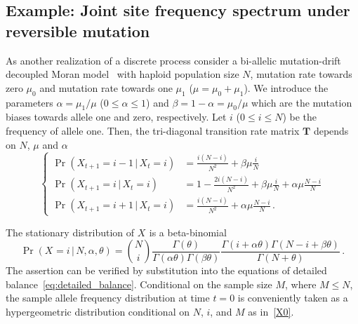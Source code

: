 \documentclass[preprint]{elsarticle}
\newcommand\given{{\,|\,}}
\newcommand\x[1]{\ensuremath{X_{#1}}}
\begin{document}
\subsection{Example: Joint site frequency spectrum under reversible mutation}\label{section:discr_rev_general}
As another realization of a discrete process consider a bi-allelic mutation-drift decoupled Moran model~\citep{Baak08,Ethe09} with haploid population size $N$, mutation rate towards zero $\mu_0$ and mutation rate towards one $\mu_1$ ($\mu=\mu_0+\mu_1$).  We introduce the parameters $\alpha=\mu_1/\mu$ ($0 \leq \alpha \leq 1$) and $\beta=1-\alpha=\mu_0/\mu$ which are the mutation biases towards allele one and zero, respectively.  Let $i$ ($0\leq i\leq N$) be the frequency of allele one. Then, the tri-diagonal transition rate matrix $\mathbf{T}$ depends on $N$, $\mu$ and $\alpha$
\begin{equation}\label{eq:transition_decoupled_Moran}
\begin{cases}
\Pr(\x{t+1}=i-1\given \x{t}=i)&=\frac{i(N-i)}{N^2}+\beta\mu \frac{i}{N}\\
    \Pr(\x{t+1}=i\given \x{t}=i)&=1-\frac{2i(N-i)}{N^2}+\beta\mu \frac{i}{N} + \alpha\mu \frac{N-i}N\\
\Pr(\x{t+1}=i+1\given \x{t}=i)&=\frac{i(N-i)}{N^2}+\alpha\mu \frac{N-i}N\,.
\end{cases}
\end{equation}

The stationary distribution of $\x{}$ is a beta-binomial
\begin{equation}\label{beta_bin}
\Pr(\x{}=i\given N,\alpha,\theta)=\binom{N}{i}
\frac{\Gamma(\theta)}{\Gamma(\alpha\theta)\Gamma(\beta\theta)}
\frac{\Gamma(i+\alpha\theta)\Gamma(N-i+\beta\theta)}{\Gamma(N+\theta)}\,.
\end{equation}
The assertion can be verified by substitution into the equations of detailed balance~\eqref{eq:detailed_balance}. Conditional on the sample size $M$, where $M\leq N$, the sample allele frequency distribution at time $t=0$ is conveniently taken as a hypergeometric distribution conditional on $N$, $i$, and $M$ as in~\eqref{X0}.

\end{document}

